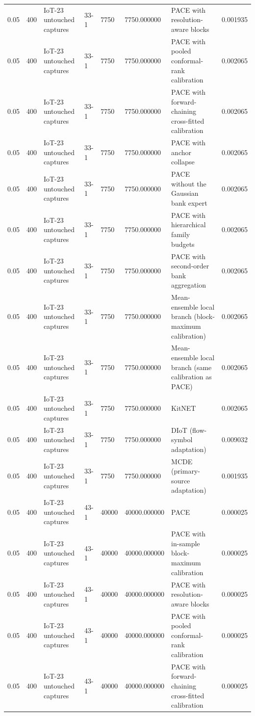 \begin{tabular}{llllllll}
0.05 & 400 & IoT-23 untouched captures & 33-1 & 7750 & 7750.000000 & PACE with resolution-aware blocks & 0.001935 \\
0.05 & 400 & IoT-23 untouched captures & 33-1 & 7750 & 7750.000000 & PACE with pooled conformal-rank calibration & 0.002065 \\
0.05 & 400 & IoT-23 untouched captures & 33-1 & 7750 & 7750.000000 & PACE with forward-chaining cross-fitted calibration & 0.002065 \\
0.05 & 400 & IoT-23 untouched captures & 33-1 & 7750 & 7750.000000 & PACE with anchor collapse & 0.002065 \\
0.05 & 400 & IoT-23 untouched captures & 33-1 & 7750 & 7750.000000 & PACE without the Gaussian bank expert & 0.002065 \\
0.05 & 400 & IoT-23 untouched captures & 33-1 & 7750 & 7750.000000 & PACE with hierarchical family budgets & 0.002065 \\
0.05 & 400 & IoT-23 untouched captures & 33-1 & 7750 & 7750.000000 & PACE with second-order bank aggregation & 0.002065 \\
0.05 & 400 & IoT-23 untouched captures & 33-1 & 7750 & 7750.000000 & Mean-ensemble local branch (block-maximum calibration) & 0.002065 \\
0.05 & 400 & IoT-23 untouched captures & 33-1 & 7750 & 7750.000000 & Mean-ensemble local branch (same calibration as PACE) & 0.002065 \\
0.05 & 400 & IoT-23 untouched captures & 33-1 & 7750 & 7750.000000 & KitNET & 0.002065 \\
0.05 & 400 & IoT-23 untouched captures & 33-1 & 7750 & 7750.000000 & DIoT (flow-symbol adaptation) & 0.009032 \\
0.05 & 400 & IoT-23 untouched captures & 33-1 & 7750 & 7750.000000 & MCDE (primary-source adaptation) & 0.001935 \\
0.05 & 400 & IoT-23 untouched captures & 43-1 & 40000 & 40000.000000 & PACE & 0.000025 \\
0.05 & 400 & IoT-23 untouched captures & 43-1 & 40000 & 40000.000000 & PACE with in-sample block-maximum calibration & 0.000025 \\
0.05 & 400 & IoT-23 untouched captures & 43-1 & 40000 & 40000.000000 & PACE with resolution-aware blocks & 0.000025 \\
0.05 & 400 & IoT-23 untouched captures & 43-1 & 40000 & 40000.000000 & PACE with pooled conformal-rank calibration & 0.000025 \\
0.05 & 400 & IoT-23 untouched captures & 43-1 & 40000 & 40000.000000 & PACE with forward-chaining cross-fitted calibration & 0.000025 \\

\end{tabular}
